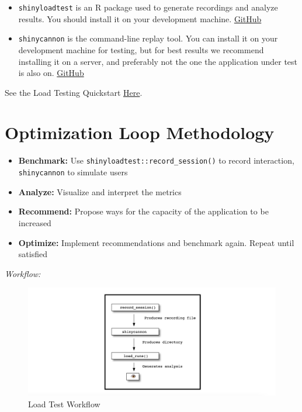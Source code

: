 \documentclass[]{book}
\providecommand{\tightlist}{%
  \setlength{\itemsep}{0pt}\setlength{\parskip}{0pt}}
\theoremstyle{definition}
\theoremstyle{definition}
\theoremstyle{definition}
\theoremstyle{remark}
\begin{document}
\begin{itemize}
\tightlist
\item
  \texttt{shinyloadtest} is an R package used to generate recordings and
  analyze results. You should install it on your development machine.
  \href{https://github.com/rstudio/shinyloadtest}{GitHub}
\item
  \texttt{shinycannon} is the command-line replay tool. You can install
  it on your development machine for testing, but for best results we
  recommend installing it on a server, and preferably not the one the
  application under test is also on.
  \href{https://github.com/rstudio/shinycannon}{GitHub}
\end{itemize}

See the Load Testing Quickstart
\href{https://rstudio.github.io/shinyloadtest/\#quick-start}{Here}.

\hypertarget{optimization-loop-methodology}{%
\section{Optimization Loop
Methodology}\label{optimization-loop-methodology}}

\begin{itemize}
\tightlist
\item
  \textbf{Benchmark:} Use \texttt{shinyloadtest::record\_session()} to
  record interaction, \texttt{shinycannon} to simulate users
\item
  \textbf{Analyze:} Visualize and interpret the metrics
\item
  \textbf{Recommend:} Propose ways for the capacity of the application
  to be increased
\item
  \textbf{Optimize:} Implement recommendations and benchmark again.
  Repeat until satisfied
\end{itemize}

\emph{Workflow:}

\begin{figure}
\centering
\includegraphics{imgs/loadtesting/loadtest-workflow.png}
\caption{Load Test Workflow}
\end{figure}
\end{document}
